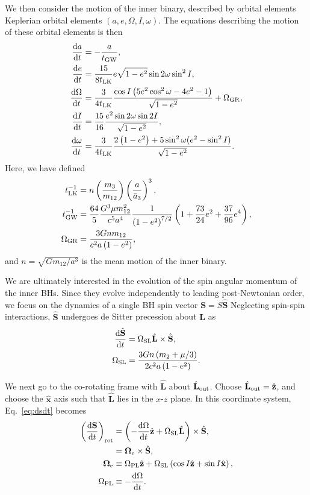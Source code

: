 \documentclass[
        fleqn,
        usenatbib,
    ]{mnras}
\newcommand*{\rd}[2]{\frac{\mathrm{d}#1}{\mathrm{d}#2}}
\newcommand*{\bm}[1]{\boldsymbol{\mathbf{#1}}}
\newcommand*{\uv}[1]{\hat{\bm{#1}}}
\newcommand*{\p}[1]{\left(#1\right)}
\begin{document}
We then consider the motion of the inner binary, described by orbital elements
Keplerian orbital elements $(a, e, \Omega, I, \omega)$. The equations describing
the motion of these orbital elements is then \citep{peters1964,storch,bin2}
\begin{align}
    \rd{a}{t} &= -\frac{a}{t_{\rm GW}},\\
    \rd{e}{t} &= \frac{15}{8t_{\rm LK}} e\sqrt{1 - e^2}\sin 2\omega
        \sin^2 I,\\
    \rd{\Omega}{t} &= \frac{3}{4t_{\rm LK}}
        \frac{\cos I\p{5e^2 \cos^2\omega - 4e^2 - 1}}{\sqrt{1 - e^2}}
        + \Omega_{\rm GR},\\
    \rd{I}{t} &= \frac{15}{16}\frac{e^2\sin 2\omega \sin 2I}{
        \sqrt{1 - e^2}},\\
    \rd{\omega}{t} &= \frac{3}{4t_{\rm LK}}
        \frac{2\p{1 - e^2} + 5\sin^2\omega
            (e^2 - \sin^2 I)}{\sqrt{1 - e^2}}.
\end{align}
Here, we have defined
\begin{align}
    t_{\rm LK}^{-1} &= n\p{\frac{m_3}{m_{12}}}\p{\frac{a}{\bar{a}_3}}^3,\\
    t_{\rm GW}^{-1} &= \frac{64}{5}\frac{G^3 \mu m_{12}^2}{c^5a^4}
        \frac{1}{\p{1 - e^2}^{7/2}}\p{1 + \frac{73}{24}e^2
            + \frac{37}{96}e^4},\\
    \Omega_{\rm GR} &= \frac{3Gnm_{12}}{c^2a\p{1 - e^2}},
\end{align}
and $n = \sqrt{Gm_{12}/a^3}$ is the mean motion of the inner binary.

We are ultimately interested in the evolution of the spin angular momentum of
the inner BHs. Since they evolve independently to leading post-Newtonian order,
we focus on the dynamics of a single BH spin vector $\bm{S} = S\uv{S}$
Neglecting spin-spin interactions, $\uv{S}$ undergoes de Sitter precession about
$\bm{L}$ as
\begin{align}
    \rd{\hat{\bm{S}}}{t} &= \Omega_{\rm SL}\hat{\bm{L}} \times \hat{\bm{S}}
            \label{eq:dsdt},\\
        \Omega_{\rm SL} &= \frac{3Gn\p{m_2 + \mu/3}}{2c^2a\p{1 - e^2}}.
\end{align}

We next go to the co-rotating frame with $\uv{L}$ about $\uv{L}_{\rm out}$. Choose
$\uv{L}_{\rm out} = \uv{z}$, and choose the $\uv{x}$ axis such that $\uv{L}$
lies in the $x$-$z$ plane. In this coordinate system, Eq.~\eqref{eq:dsdt}
becomes
\begin{align}
    \p{\rd{\bm{S}}{t}}_{\rm rot}
        &= \p{-\rd{\Omega}{t}\uv{z} + \Omega_{\rm SL}\uv{L}} \times \uv{S},\\
        &= \bm{\Omega}_{\rm e} \times \uv{S}\label{eq:dsdt_weff},\\
    \bm{\Omega}_{\rm e} &\equiv \Omega_{\rm PL}\uv{z} + \Omega_{\rm SL}
            \p{\cos I \uv{z} + \sin I \uv{x}},\\
    \Omega_{\rm PL} &\equiv -\rd{\Omega}{t}.
\end{align}
\end{document}
